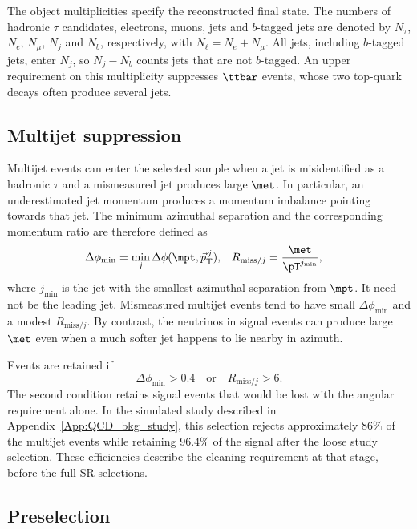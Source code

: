 The object multiplicities specify the reconstructed final state.
    The numbers of hadronic $\tau$ candidates, electrons, muons, jets and $b$-tagged jets are denoted by $N_\tau$, $N_e$, $N_\mu$, $N_j$ and $N_b$, respectively, with $N_\ell=N_e+N_\mu$.
    All jets, including $b$-tagged jets, enter $N_j$, so $N_j-N_b$ counts jets that are not $b$-tagged.
    An upper requirement on this multiplicity suppresses $\ttbar$ events, whose two top-quark decays often produce several jets.

\subsection{Multijet suppression}
\label{subsec:ch7_multijet}

Multijet events can enter the selected sample when a jet is misidentified as a hadronic $\tau$ and a mismeasured jet produces large $\met$.
In particular, an underestimated jet momentum produces a momentum imbalance pointing towards that jet.
The minimum azimuthal separation and the corresponding momentum ratio are therefore defined as
\begin{align}
    \Delta\phi_{\min} &= \min_j\Delta\phi(\mpt,\vec p_{\mathrm{T}}^{\,j}),
    &R_{\mathrm{miss}/j} &= \frac{\met}{\pT^{j_{\min}}},
    \label{eq:ch7_qcd_variables}
\end{align}
where $j_{\min}$ is the jet with the smallest azimuthal separation from $\mpt$.
It need not be the leading jet.
Mismeasured multijet events tend to have small $\Delta\phi_{\min}$ and a modest $R_{\mathrm{miss}/j}$.
By contrast, the neutrinos in signal events can produce large $\met$ even when a much softer jet happens to lie nearby in azimuth.

Events are retained if
\begin{equation}
    \Delta\phi_{\min}>0.4
    \quad\text{or}\quad
    R_{\mathrm{miss}/j}>6.
    \label{eq:ch7_qcd_cut}
\end{equation}
The second condition retains signal events that would be lost with the angular requirement alone.
In the simulated study described in Appendix~\ref{App:QCD_bkg_study}, this selection rejects approximately $86\%$ of the multijet events while retaining $96.4\%$ of the signal after the loose study selection.
These efficiencies describe the cleaning requirement at that stage, before the full SR selections.

\subsection{Preselection}
\label{subsec:ch7_common_preselection}

